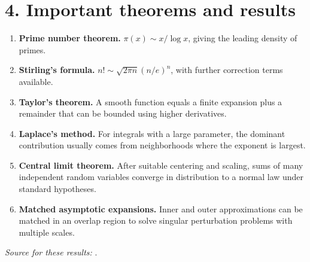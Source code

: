 \section*{4. Important theorems and results}
\begin{enumerate}[leftmargin=*,itemsep=0.35em]
\item \textbf{Prime number theorem.} $\pi(x)\sim x/\log x$, giving the leading density of primes.
\item \textbf{Stirling's formula.} $n!\sim\sqrt{2\pi n}(n/e)^n$, with further correction terms available.
\item \textbf{Taylor's theorem.} A smooth function equals a finite expansion plus a remainder that can be bounded using higher derivatives.
\item \textbf{Laplace's method.} For integrals with a large parameter, the dominant contribution usually comes from neighborhoods where the exponent is largest.
\item \textbf{Central limit theorem.} After suitable centering and scaling, sums of many independent random variables converge in distribution to a normal law under standard hypotheses.
\item \textbf{Matched asymptotic expansions.} Inner and outer approximations can be matched in an overlap region to solve singular perturbation problems with multiple scales.
\end{enumerate}
\noindent\emph{Source for these results:} \cite{asymptotic_theory_ref1}.

